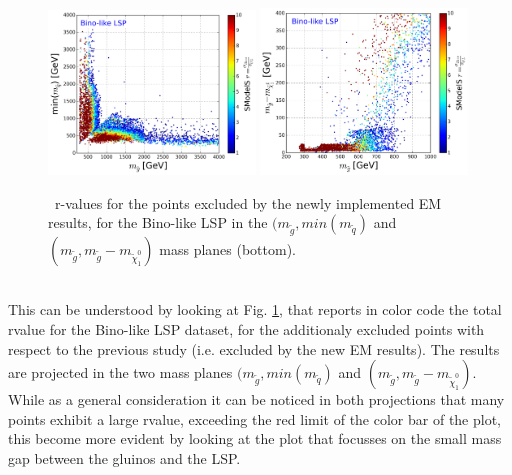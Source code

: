 \documentclass[epj,nopacs,fleqn]{svjour}
\begin{document}
\begin{figure}[b]
\begin{center}
\subfigure
\includegraphics[width=0.49\textwidth]{PLOTS/BINO_rValus_Glu_Sq.png}
\subfigure
{\includegraphics[width=0.49\textwidth]{PLOTS/BINO_rValus_Glu_Diff_Neu.png}}
\end{center}
\caption{\SMO~r-values for the points excluded by the newly implemented EM results, for the Bino-like LSP in the $(m_{\tilde{g}},min(m_{\tilde q})$ and $(m_{\tilde{g}}, m_{\tilde{g}} - m_{\tilde \chi _1 ^0 })$ mass planes (bottom).} 
\label{rValues}
\end{figure}
\\
This can be understood by looking at Fig. \ref{rValues}, that reports in color code the total \SMO rvalue for the Bino-like LSP dataset, for the additionaly excluded points with respect to the previous study (i.e. excluded by the new EM results). The results are projected in the two mass planes $(m_{\tilde{g}},min(m_{\tilde q})$ and $(m_{\tilde{g}}, m_{\tilde{g}} - m_{\tilde \chi _1 ^0 })$. While as a general consideration it can be noticed in both projections that many points exhibit a large rvalue, exceeding the red limit of the color bar of the plot, this become more evident by looking at the plot that focusses on the small mass gap between the gluinos and the LSP. 
\\
\end{document}
